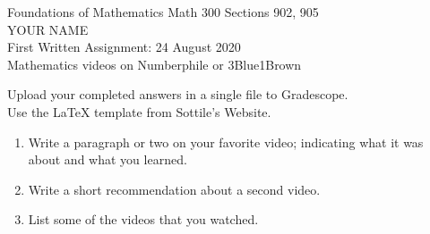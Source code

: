 \documentclass[12pt]{article}
\begin{document}
\LARGE 
\noindent
{\color{Maroon}Foundations of Mathematics \hfill Math 300 Sections 902, 905}\vspace{2pt}\\
\Large YOUR NAME\vspace{2pt}\\
\large
First Written Assignment: \hfill 24 August 2020\\
Mathematics videos on Numberphile or 3{\color{blue}Blue}1{\color{brown}Brown}\vspace{20pt}
\normalsize


%
{\Large{\color{red}Upload your completed answers in a single file to Gradescope. \\ Use the LaTeX template from Sottile's Website.}}
%

\begin{enumerate}

  \item    {\color{Maroon} Write a paragraph or two on your favorite video; indicating what it was about and what you learned.}


  \item  {\color{Maroon} Write a short recommendation about a second video.}

    
  \item  {\color{Maroon} List some of the videos that you watched.}


\end{enumerate}
\end{document}
